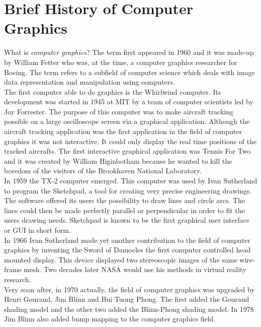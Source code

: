 \section{Brief History of Computer Graphics}
What is \textit{computer graphics}? The term first appeared in 1960 and it was made-up by William Fetter who was, at the time, a computer graphics researcher for Boeing. The term refers to a subfield of computer science which deals with image data representation and manipulation using computers.\\

The first computer able to do graphics is the Whirlwind computer. Its development was started in 1945 at MIT by a team of computer scientists led by Jay Forrester. The purpose of this computer was to make aircraft tracking possible on a large oscilloscope screen via a graphical application. Although the aircraft tracking application was the first application in the field of computer graphics it was not interactive. It could only display the real time positions of the tracked aircrafts. The first interactive graphical application was Tennis For Two and it was created by William Higinbotham because he wanted to kill the boredom of the visitors of the Brookhaven National Laboratory.\\

In 1959 the TX-2 computer emerged. This computer was used by Ivan Sutherland to program the Sketchpad, a tool for creating very precise engineering drawings. The software offered its users the possibility to draw lines and circle arcs. The lines could then be made perfectly parallel or perpendicular in order to fit the users drawing needs. Sketchpad is known to be the first graphical user interface or GUI in short form.\\

In 1966 Ivan Sutherland made yet another contribution to the field of computer graphics by inventing the Sword of Damocles the first computer controlled head mounted display. This device displayed two stereoscopic images of the same wire-frame mesh. Two decades later NASA would use his methods in virtual reality research.\\

Very soon after, in 1970 actually, the field of computer graphics was upgraded by Henri Gouraud, Jim Blinn and Bui Tuong Phong. The first added the Gouraud shading model and the other two added the Blinn-Phong shading model. In 1978 Jim Blinn also added bump mapping to the computer graphics field.\\
\newpage
